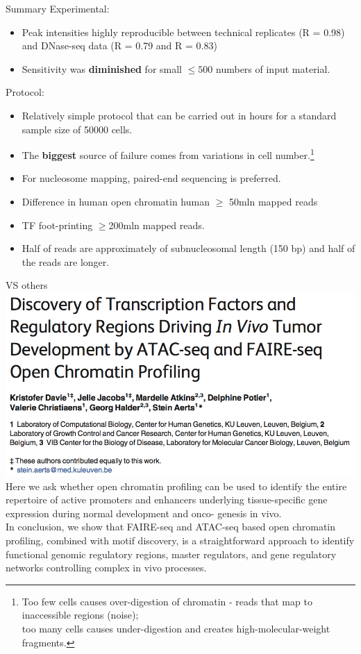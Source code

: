 \documentclass{beamer}
\begin{document}
\begin{frame}{Summary}
Experimental:
\begin{itemize}
\item Peak intensities highly reproducible between technical replicates (R = 0.98) and DNase-seq data (R = 0.79 and R = 0.83)
\item Sensitivity was \textbf{diminished} for small $\leq 500$ numbers of input material.
\end{itemize}
Protocol:
\begin{itemize}
\item Relatively simple protocol that can be carried out in hours for a standard sample size of 50000 cells.
\item The \textbf{biggest} source of failure comes from variations in cell number.\footnote{Too few cells causes over-digestion of chromatin - reads that map to inaccessible regions (noise);\\too many cells causes under-digestion and creates high-molecular-weight fragments.}
\item For nucleosome mapping, paired-end sequencing is preferred.
\item Difference in human open chromatin human $\geq$ 50mln mapped reads
\item TF foot-printing $\geq$200mln mapped reads.
\item Half of reads are approximately of subnucleosomal length (150 bp) and half of the reads are longer.
\end{itemize}
\end{frame}


\begin{frame}{VS others}
\includegraphics[width=\linewidth]{atac_vs_faire.png}\\
\tiny{Here we ask whether open chromatin profiling can be used to identify the entire repertoire of active promoters and enhancers underlying tissue-specific gene expression during normal development and onco- genesis in vivo.\\
In conclusion, we show that FAIRE-seq and ATAC-seq based open chromatin profiling, combined with motif discovery, is a straightforward approach to identify functional genomic regulatory regions, master regulators, and gene regulatory networks controlling complex in vivo processes.}
\end{frame}
\end{document}
